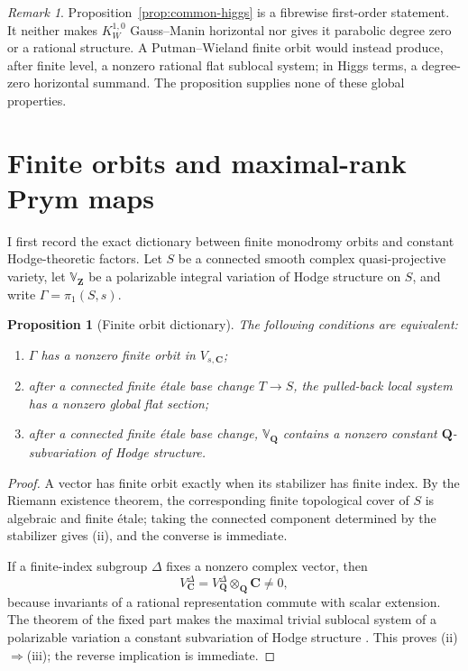 \documentclass[11pt,reqno]{amsart}
\numberwithin{equation}{section}
\newtheorem{proposition}[theorem]{Proposition}
\theoremstyle{definition}
\theoremstyle{remark}
\newtheorem{remark}[theorem]{Remark}
\newcommand{\C}{\mathbf C}
\newcommand{\Q}{\mathbf Q}
\newcommand{\Z}{\mathbf Z}
\begin{document}
\begin{remark}\label{rem:kernel-not-flat}
Proposition~\ref{prop:common-higgs} is a fibrewise first-order statement.  It neither makes $K_W^{1,0}$ Gauss--Manin horizontal nor gives it parabolic degree zero or a rational structure.  A Putman--Wieland finite orbit would instead produce, after finite level, a nonzero rational flat sublocal system; in Higgs terms, a degree-zero horizontal summand.  The proposition supplies none of these global properties.
\end{remark}

\section{Finite orbits and maximal-rank Prym maps}\label{sec:pw}

I first record the exact dictionary between finite monodromy orbits and constant Hodge-theoretic factors.  Let $S$ be a connected smooth complex quasi-projective variety, let $\mathbb V_{\Z}$ be a polarizable integral variation of Hodge structure on $S$, and write $\Gamma=\pi_1(S,s)$.

\begin{proposition}[Finite orbit dictionary]\label{prop:finite-orbit-dictionary}
The following conditions are equivalent:
\begin{enumerate}[label=\textup{(\roman*)}]
\item $\Gamma$ has a nonzero finite orbit in $V_{s,\C}$;
\item after a connected finite \'etale base change $T\to S$, the pulled-back local system has a nonzero global flat section;
\item after a connected finite \'etale base change, $\mathbb V_{\Q}$ contains a nonzero constant $\Q$-subvariation of Hodge structure.
\end{enumerate}
\end{proposition}

\begin{proof}
A vector has finite orbit exactly when its stabilizer has finite index.  By the Riemann existence theorem, the corresponding finite topological cover of $S$ is algebraic and finite \'etale; taking the connected component determined by the stabilizer gives (ii), and the converse is immediate.

If a finite-index subgroup $\Delta$ fixes a nonzero complex vector, then
\[
V_{\C}^{\Delta}=V_{\Q}^{\Delta}\otimes_{\Q}\C\ne0,
\]
because invariants of a rational representation commute with scalar extension.  The theorem of the fixed part makes the maximal trivial sublocal system of a polarizable variation a constant subvariation of Hodge structure \cite[Section~6(a)]{GriffithsSchmid1975}.  This proves (ii)$\Rightarrow$(iii); the reverse implication is immediate.
\end{proof}
\end{document}
